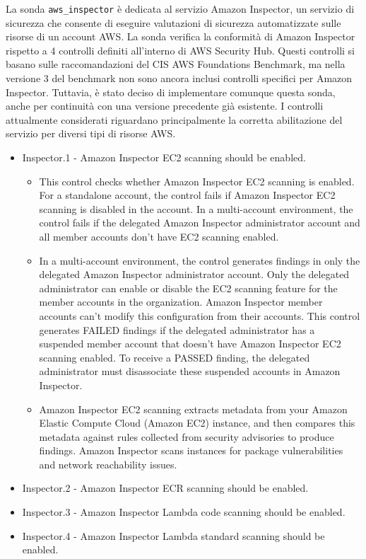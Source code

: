 La sonda \texttt{aws\_inspector} è dedicata al servizio Amazon Inspector, un servizio di sicurezza che consente di eseguire valutazioni di sicurezza automatizzate sulle risorse di un account AWS. La sonda verifica la conformità di Amazon Inspector rispetto a 4 controlli definiti all'interno di AWS Security Hub. Questi controlli si basano sulle raccomandazioni del CIS AWS Foundations Benchmark, ma nella versione 3 del benchmark non sono ancora inclusi controlli specifici per Amazon Inspector. Tuttavia, è stato deciso di implementare comunque questa sonda, anche per continuità con una versione precedente già esistente. I controlli attualmente considerati riguardano principalmente la corretta abilitazione del servizio per diversi tipi di risorse AWS.

\begin{mdframed}[backgroundcolor=gray!05, linecolor=gray!50]
\itshape
\begin{itemize}
    \item Inspector.1 - Amazon Inspector EC2 scanning should be enabled.
    \begin{itemize}
        \item This control checks whether Amazon Inspector EC2 scanning is enabled. For a standalone account, the control fails if Amazon Inspector EC2 scanning is disabled in the account. In a multi-account environment, the control fails if the delegated Amazon Inspector administrator account and all member accounts don't have EC2 scanning enabled.
        \item In a multi-account environment, the control generates findings in only the delegated Amazon Inspector administrator account. Only the delegated administrator can enable or disable the EC2 scanning feature for the member accounts in the organization. Amazon Inspector member accounts can't modify this configuration from their accounts. This control generates FAILED findings if the delegated administrator has a suspended member account that doesn't have Amazon Inspector EC2 scanning enabled. To receive a PASSED finding, the delegated administrator must disassociate these suspended accounts in Amazon Inspector.
        \item Amazon Inspector EC2 scanning extracts metadata from your Amazon Elastic Compute Cloud (Amazon EC2) instance, and then compares this metadata against rules collected from security advisories to produce findings. Amazon Inspector scans instances for package vulnerabilities and network reachability issues.
    \end{itemize}

    \item Inspector.2 - Amazon Inspector ECR scanning should be enabled.

    \item Inspector.3 - Amazon Inspector Lambda code scanning should be enabled.

    \item Inspector.4 - Amazon Inspector Lambda standard scanning should be enabled.
\end{itemize}
\end{mdframed}
